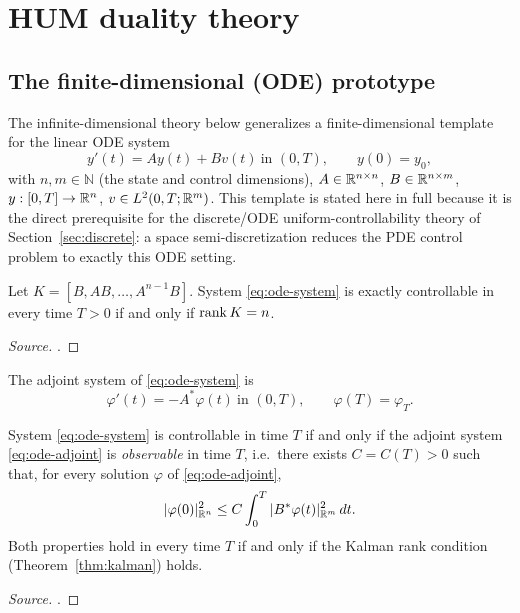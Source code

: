 \section{HUM duality theory}
\label{sec:hum-duality}

\subsection{The finite-dimensional (ODE) prototype}
\label{ssec:ode-prototype}

The infinite-dimensional theory below generalizes a finite-dimensional
template for the linear ODE system
\begin{equation}
  \label{eq:ode-system}
  y'(t) = Ay(t) + Bv(t) \ \text{in } (0,T), \qquad y(0) = y_0,
\end{equation}
with $n,m \in \mathbb{N}$ (the state and control dimensions),
$A \in \mathbb{R}^{n\times n}$, $B \in \mathbb{R}^{n\times m}$, $y : [0,T]\to\mathbb{R}^n$,
$v \in L^2(0,T;\mathbb{R}^m)$. This template is stated here in full because it is the
direct prerequisite for the discrete/ODE uniform-controllability theory of
Section~\ref{sec:discrete}: a space semi-discretization reduces the PDE
control problem to exactly this ODE setting.

\begin{theorem}
  \label{thm:kalman}
  Let $K = [B, AB, \dots, A^{n-1}B]$. System \eqref{eq:ode-system} is exactly
  controllable in every time $T>0$ if and only if $\operatorname{rank} K = n$.
\end{theorem}
\begin{proof}[Source]
  \citet[Thm.~1.16]{coron2007control}.
\end{proof}

The adjoint system of \eqref{eq:ode-system} is
\begin{equation}
  \label{eq:ode-adjoint}
  \varphi'(t) = -A^*\varphi(t) \ \text{in } (0,T), \qquad \varphi(T) = \varphi_T.
\end{equation}

\begin{theorem}
  \label{thm:ode-observability}
  System \eqref{eq:ode-system} is controllable in time $T$ if and only if the
  adjoint system \eqref{eq:ode-adjoint} is \emph{observable} in time $T$, i.e.\
  there exists $C=C(T)>0$ such that, for every solution $\varphi$ of
  \eqref{eq:ode-adjoint},
  \begin{equation}
    \label{eq:ode-observability-ineq}
    |\varphi(0)|^2_{\mathbb{R}^n} \le C\int_0^T |B^*\varphi(t)|^2_{\mathbb{R}^m}\,dt.
  \end{equation}
  Both properties hold in every time $T$ if and only if the Kalman rank
  condition (Theorem~\ref{thm:kalman}) holds.
\end{theorem}
\begin{proof}[Source]
  \citet[Thm.~2.1.1]{zuazua2002controllability}.
\end{proof}

